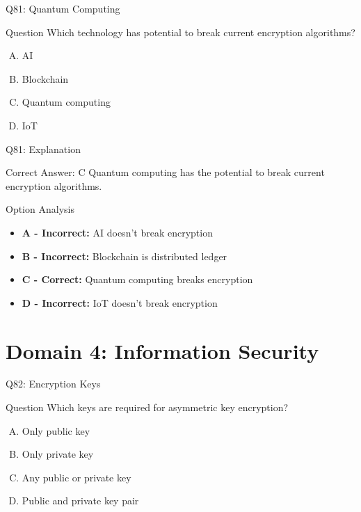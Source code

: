 \documentclass{beamer}
\begin{document}
	\begin{frame}{Q81: Quantum Computing}
		\begin{block}{Question}
			Which technology has potential to break current encryption algorithms?
		\end{block}
		\begin{enumerate}[(A)]
			\item AI
			\item Blockchain
			\item Quantum computing
			\item IoT
		\end{enumerate}
	\end{frame}
	
	\begin{frame}{Q81: Explanation}
		\begin{block}{Correct Answer: C}
			Quantum computing has the potential to break current encryption algorithms.
		\end{block}
		\begin{block}{Option Analysis}
			\begin{itemize}
				\item \textbf{A - Incorrect:} AI doesn't break encryption
				\item \textbf{B - Incorrect:} Blockchain is distributed ledger
				\item \textbf{C - Correct:} Quantum computing breaks encryption
				\item \textbf{D - Incorrect:} IoT doesn't break encryption
			\end{itemize}
		\end{block}
	\end{frame}
	
	\section{Domain 4: Information Security}
	
	\begin{frame}{Q82: Encryption Keys}
		\begin{block}{Question}
			Which keys are required for asymmetric key encryption?
		\end{block}
		\begin{enumerate}[(A)]
			\item Only public key
			\item Only private key
			\item Any public or private key
			\item Public and private key pair
		\end{enumerate}
	\end{frame}
	
\end{document}
